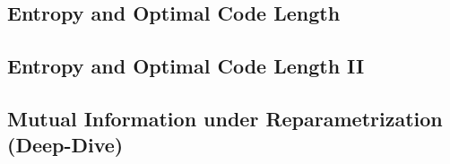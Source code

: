 \subsection{Entropy and Optimal Code Length}


\subsection{Entropy and Optimal Code Length II}


\subsection{Mutual Information under Reparametrization (Deep-Dive)}

